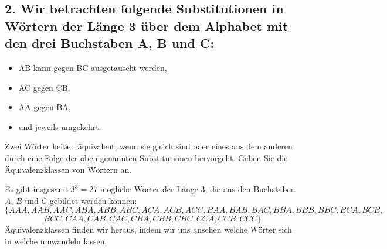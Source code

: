 \documentclass{article} %
\begin{document}
\subsection*{2. Wir betrachten folgende Substitutionen in Wörtern der Länge 3 über dem Alphabet mit den drei Buchstaben A, B und C:}
\begin{itemize}
    \item AB kann gegen BC ausgetauscht werden,
    \item AC gegen CB,
    \item AA gegen BA,
    \item und jeweils umgekehrt.
\end{itemize}
Zwei Wörter heißen äquivalent, wenn sie gleich sind oder eines aus dem anderen durch eine Folge der oben genannten Substitutionen hervorgeht. Geben Sie die Äquivalenzklassen von Wörtern an.
\begin{mybox}
Es gibt insgesamt $3^3=27$ mögliche Wörter der Länge 3, die aus den Buchstaben $A$, $B$ und $C$ gebildet werden können: \[
\{AAA,AAB,AAC,ABA,ABB,ABC,ACA,ACB,ACC,BAA,BAB,BAC,BBA,BBB,BBC,BCA,BCB,
\]
\[BCC,CAA,CAB,CAC,CBA,CBB,CBC,CCA,CCB,CCC\}\]
Äquivalenzklassen finden wir heraus, indem wir uns ansehen welche Wörter sich in welche umwandeln lassen. \\ \newline
\end{mybox}
\end{document}
